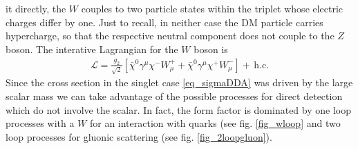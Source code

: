 it directly, the $W$ couples to two particle states within the triplet whose electric charges differ by one. Just to recall, in neither case the 
DM particle carries hypercharge, so that the respective neutral component does not couple to the $Z$ boson. The interative Lagrangian for the $W$ 
boson is 
\begin{align}
 \mathcal{L} = \frac{g_2}{\sqrt{2}} \left[\bar \chi^0 \gamma^\mu \chi^- W^+_\mu + \bar \chi^0 \gamma^\mu \chi^+W^-_\mu\right] +\, \text{h.c.}
\end{align}
Since the cross section in the singlet case \eqref{eq_sigmaDDA} was driven by the large scalar mass we can take advantage of the possible processes
for direct detection which do not involve the scalar. In fact, the form factor is dominated by one loop processes with a $W$ for an interaction with
quarks (see fig. \ref{fig_wloop} and two loop processes for gluonic scattering (see fig. \ref{fig_2loopgluon}). 






